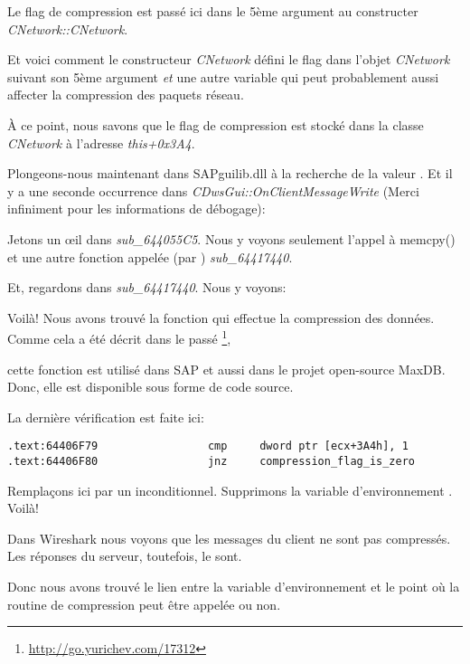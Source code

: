 Le flag de compression est passé ici dans le 5ème argument au constructer \emph{CNetwork::CNetwork}.

Et voici comment le constructeur \emph{CNetwork} défini le flag dans l'objet \emph{CNetwork}
suivant son 5ème argument \emph{et} une autre variable qui peut probablement aussi
affecter la compression des paquets réseau.



À ce point, nous savons que le flag de compression est stocké dans la classe
\emph{CNetwork} à l'adresse \emph{this+0x3A4}.

Plongeons-nous maintenant dans SAPguilib.dll à la recherche de la valeur .
Et il y a une seconde occurrence dans \emph{CDwsGui::OnClientMessageWrite} (Merci
infiniment pour les informations de débogage):



Jetons un \oe{}il dans \emph{sub\_644055C5}. Nous y voyons seulement l'appel à memcpy()
et une autre fonction appelée (par \IDA) \emph{sub\_64417440}.

Et, regardons dans \emph{sub\_64417440}. Nous y voyons:



Voilà! Nous avons trouvé la fonction qui effectue la compression des données.
Comme cela a été décrit dans le passé
\footnote{\url{http://go.yurichev.com/17312}},

cette fonction est utilisé dans SAP et aussi dans le projet open-source MaxDB.
Donc, elle est disponible sous forme de code source.

La dernière vérification est faite ici:

\begin{lstlisting}[style=customasmx86]
.text:64406F79                 cmp     dword ptr [ecx+3A4h], 1
.text:64406F80                 jnz     compression_flag_is_zero
\end{lstlisting}

Remplaçons ici \JNZ par un \JMP inconditionnel. Supprimons la variable d'environnement
\TDWNC. Voilà!

Dans Wireshark nous voyons que les messages du client ne sont pas compressés. Les
réponses du serveur, toutefois, le sont.

Donc nous avons trouvé le lien entre la variable d'environnement et le point où la
routine de compression peut être appelée ou non.
